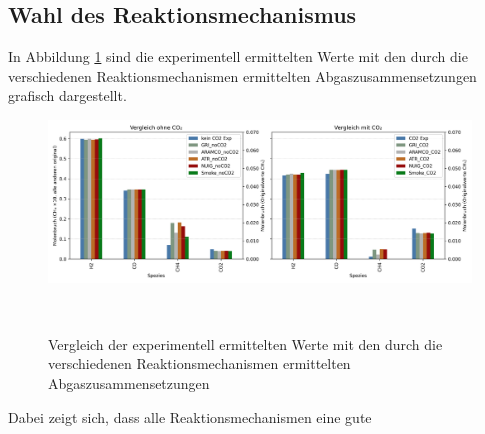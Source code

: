 \documentclass[footmark=none]{tubaf-thesis}
\begin{document}
        \subsection{Wahl des Reaktionsmechanismus} 
             In Abbildung \ref{fig:vergleich_balkendiagramm} sind die experimentell ermittelten Werte mit den durch die verschiedenen Reaktionsmechanismen ermittelten Abgaszusammensetzungen grafisch dargestellt.
             \begin{figure}[H]
            \centering
            \includegraphics[width=0.8\linewidth]{img_py/vergleich_Experimentaldaten_scaled_CH4.png}
            \caption{Vergleich der experimentell ermittelten Werte mit den durch die verschiedenen Reaktionsmechanismen ermittelten Abgaszusammensetzungen}~\label{fig:vergleich_balkendiagramm}
        \end{figure}
        Dabei zeigt sich, dass alle Reaktionsmechanismen eine gute 
    \pagebreak
    \printbibliography[heading=bibintoc,title=Quellenverzeichnis]
\end{document}
